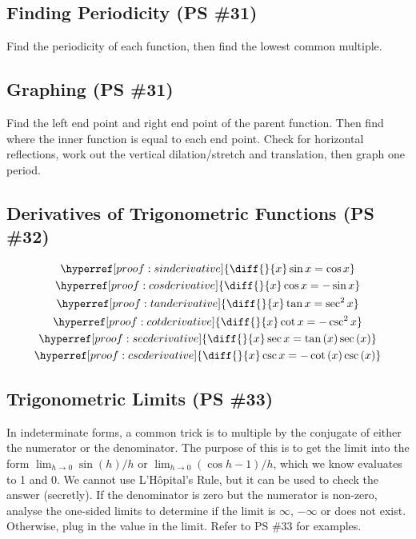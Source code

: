 \documentclass{article}
\begin{document}
\subsection{Finding Periodicity (PS \#31)}
Find the periodicity of each function, then find the lowest
common multiple.

\subsection{Graphing (PS \#31)}
Find the left end point and right end point of the parent function.
Then find where the inner function is equal to each end point.
Check for horizontal reflections, work out the vertical
dilation/stretch and translation, then graph one period.

\subsection{Derivatives of Trigonometric Functions (PS \#32)}
\begin{gather*}
	\hyperref[proof:sinderivative]{
		\diff{}{x}\sin x=\cos x
	} \\
	\hyperref[proof:cosderivative]{
		\diff{}{x}\cos x=-\sin x
	} \\
	\hyperref[proof:tanderivative]{
		\diff{}{x}\tan x=\sec^2x
	} \\
	\hyperref[proof:cotderivative]{
		\diff{}{x}\cot x=-\csc^2x
	} \\
	\hyperref[proof:secderivative]{
		\diff{}{x}\sec x=\tan\left(x\right)\sec\left(x\right)
	} \\
	\hyperref[proof:cscderivative]{
		\diff{}{x}\csc x=-\cot\left(x\right)\csc\left(x\right)
	}
\end{gather*}

\subsection{Trigonometric Limits (PS \#33)}
In indeterminate forms, a common trick is to multiple by the
conjugate of either the numerator or the denominator. The purpose
of this is to get the limit into the form $\lim_{h\to0}\sin\left(
h\right)/h$ or $\lim_{h\to0}\left(\cos h-1\right)/h$, which we know
evaluates to 1 and 0. We cannot use L'Hôpital's Rule, but it can be
used to check the answer (secretly). If the denominator is zero but
the numerator is non-zero, analyse the one-sided limits to determine
if the limit is $\infty$, $-\infty$ or does not exist. Otherwise,
plug in the value in the limit. Refer to PS \#33 for examples.
\end{document}
